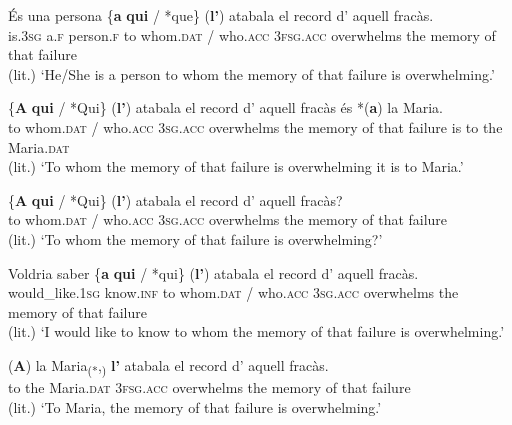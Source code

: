 \documentclass[output=paper,colorlinks,citecolor=brown,modfonts,nonflat]{langsci/langscibook}
\begin{document}
{{\ea%
 \label{ex:royo:14}
 \ea \label{ex:royo:14a}
 \gll És una persona \{\textbf{a} \textbf{qui} / *que\} (\textbf{l’}) atabala el record d’ aquell fracàs.\\
  is.\textsc{3sg} a.\textsc{f} person.\textsc{f} to whom.\textsc{dat} / who.\textsc{acc} \textsc{3fsg.acc} overwhelms the memory of that failure\\
\glt (lit.) ‘He/She is a person to whom the memory of that failure is overwhelming.’
 
 \ex \label{ex:royo:14b}
 \gll \{\textbf{A} \textbf{qui} / *Qui\} (\textbf{l’}) atabala el record d’ aquell fracàs és *(\textbf{a}) la Maria.\\
 to whom.\textsc{dat} / who.\textsc{acc} \textsc{3sg.acc} overwhelms the memory of that failure is to the Maria.\textsc{dat}\\
\glt (lit.) ‘To whom the memory of that failure is overwhelming it is to Maria.’
 
 \ex \label{ex:royo:14c}
 \gll \{\textbf{A} \textbf{qui} / *Qui\} (\textbf{l’}) atabala el record d' aquell fracàs?\\
 to whom.\textsc{dat} / who.\textsc{acc} \textsc{3sg.acc} overwhelms the memory of that failure\\
\glt (lit.) ‘To whom the memory of that failure is overwhelming?’
 
 \ex \label{ex:royo:14d}
 \gll Voldria saber \{\textbf{a} \textbf{qui} / *qui\} (\textbf{l’}) atabala el record d’ aquell fracàs.\\
 would\_like.\textsc{1sg} know.\textsc{inf}  to whom.\textsc{dat} / who.\textsc{acc} \textsc{3sg.acc} overwhelms the memory of that failure\\
\glt (lit.) ‘I would like to know to whom the memory of that failure is overwhelming.’
 
 \ex \label{ex:royo:14e}
 \gll *(\textbf{A}) la Maria\textsubscript{(*},\textsubscript{)} \textbf{l’} atabala el record d’ aquell fracàs.\footnotemark{}\\
 to the Maria.\textsc{dat} \textsc{3fsg.acc} overwhelms the memory of that failure\\
\glt (lit.) ‘To Maria, the memory of that failure is overwhelming.’
 \z
 \z
 

}}
\end{document}
